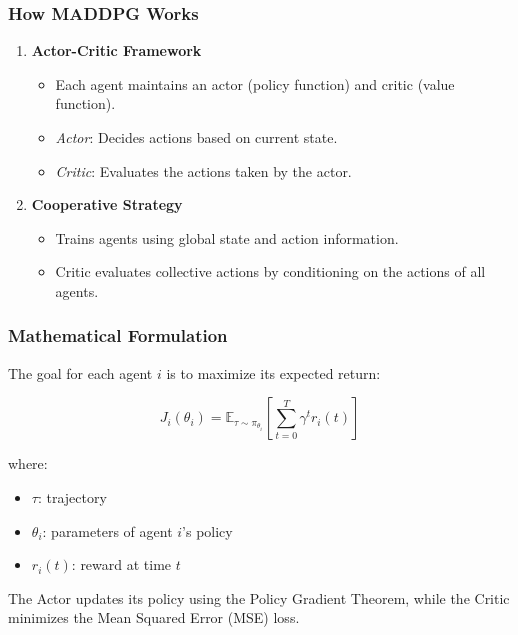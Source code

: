 \documentclass[aspectratio=169]{beamer}
\begin{document}
\begin{frame}[fragile]
    \frametitle{How MADDPG Works}
    
    \begin{enumerate}
        \item \textbf{Actor-Critic Framework}
            \begin{itemize}
                \item Each agent maintains an actor (policy function) and critic (value function).
                \item \textit{Actor}: Decides actions based on current state.
                \item \textit{Critic}: Evaluates the actions taken by the actor.
            \end{itemize}
        
        \item \textbf{Cooperative Strategy}
            \begin{itemize}
                \item Trains agents using global state and action information.
                \item Critic evaluates collective actions by conditioning on the actions of all agents.
            \end{itemize}
    \end{enumerate}
\end{frame}

\begin{frame}[fragile]
    \frametitle{Mathematical Formulation}
    
    The goal for each agent \( i \) is to maximize its expected return:
    
    \begin{equation}
        J_i(\theta_i) = \mathbb{E}_{\tau \sim \pi_{\theta_i}}\left[ \sum_{t=0}^{T} \gamma^t r_i(t) \right]
    \end{equation}
    
    where:
    \begin{itemize}
        \item \( \tau \): trajectory
        \item \( \theta_i \): parameters of agent \( i \)'s policy
        \item \( r_i(t) \): reward at time \( t \)
    \end{itemize}
    
    The Actor updates its policy using the Policy Gradient Theorem, while the Critic minimizes the Mean Squared Error (MSE) loss.
\end{frame}
\end{document}

